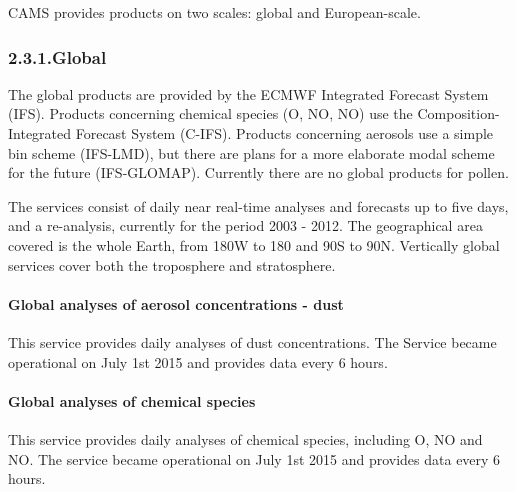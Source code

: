 \documentclass[9pt]{report}
\begin{document}
\noindent{}CAMS provides products on two scales: global and European-scale.%

\subsubsection{2.3.1.\hspace*{0.5em}Global}\label{sec-global}%

\noindent{}The global products are provided by the ECMWF Integrated Forecast System (IFS).
Products concerning chemical species (O, NO, NO) use the Composition-Integrated Forecast System (C-IFS).
Products concerning aerosols use a simple bin scheme (IFS-LMD), but there are plans for a more elaborate modal scheme for the future (IFS-GLOMAP).
Currently there are no global products for pollen.%

The services consist of daily near real-time analyses and forecasts up to five days, and a re-analysis, currently for the period 2003 - 2012.
The geographical area covered is the whole Earth, from 180\textdegree{}W to 180\textdegree{} and 90\textdegree{}S to 90\textdegree{}N.
Vertically global services cover both the troposphere and stratosphere.%

\paragraph{Global analyses of aerosol concentrations - dust}\label{sec-global-analyses-of-aerosol-concentrations---dust}%

\noindent{}\mdbr
{}This service provides daily analyses of dust concentrations.
The Service became operational on July 1st 2015 and provides data every 6 hours.%

\paragraph{Global analyses of chemical species}\label{sec-global-analyses-of-chemical-species}%

\noindent{}\mdbr
{}This service provides daily analyses of chemical species, including O, NO and NO.
The service became operational on July 1st 2015 and provides data every 6 hours.%
\end{document}
